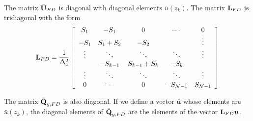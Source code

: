 \documentclass[10pt]{article}
\newcommand{\sN}{\mathcal{N}}
\newcommand{\mat}[1]{\text{\bf #1}}
\begin{document}
The matrix $\bar{\mat{U}}_{FD}$ is diagonal with diagonal elements $\bar u(z_k)$.
The matrix $\mat{L}_{FD}$ is tridiagonal with the form
\[\mat{L}_{FD} = \frac{1}{\Delta_z^2}\left[\begin{array}{ccccc}
S_1&-S_1&0&\cdots&0\\
-S_1&S_1+S_2&-S_2&&\vdots\\
\vdots&\ddots&\ddots&\ddots&\vdots\\
&-S_{k-1}&S_{k-1}+S_k&-S_k&\\
\vdots&\ddots&\ddots&\ddots&\vdots\\
0&\cdots&0&-S_{\sN-1}&S_{\sN-1}
\end{array}\right]\]

The matrix $\bar{\mat{Q}}_{y,FD}$ is also diagonal.
If we define a vector $\bar{\bm{u}}$ whose elements are $\bar u(z_k)$, the diagonal elements of $\bar{\mat{Q}}_{y,FD}$ are the elements of the vector $\mat{L}_{FD}\bar{\bm{u}}$.\\
\end{document}

